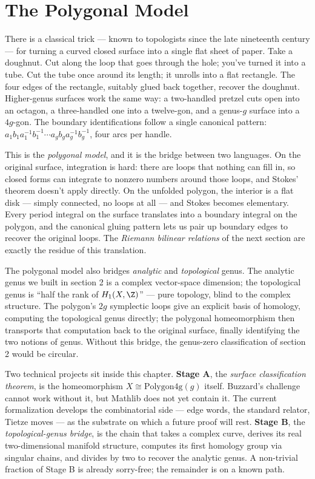 \section{The Polygonal Model}
\label{sec:polygonal-model}

\begin{layman}
There is a classical trick — known to topologists since the late
nineteenth century — for turning a curved closed surface into a
single flat sheet of paper. Take a doughnut. Cut along the loop
that goes through the hole; you've turned it into a tube. Cut the
tube once around its length; it unrolls into a flat rectangle.
The four edges of the rectangle, suitably glued back together,
recover the doughnut. Higher-genus surfaces work the same way: a
two-handled pretzel cuts open into an octagon, a three-handled one
into a twelve-gon, and a genus-\(g\) surface into a \(4g\)-gon.
The boundary identifications follow a single canonical pattern:
\(a_1 b_1 a_1^{-1} b_1^{-1} \cdots a_g b_g a_g^{-1} b_g^{-1}\),
four arcs per handle.

This is the \emph{polygonal model}, and it is the bridge between
two languages. On the original surface, integration is hard: there
are loops that nothing can fill in, so closed forms can integrate
to nonzero numbers around those loops, and Stokes' theorem doesn't
apply directly. On the unfolded polygon, the interior is a flat
disk — simply connected, no loops at all — and Stokes becomes
elementary. Every period integral on the surface translates into a
boundary integral on the polygon, and the canonical gluing pattern
lets us pair up boundary edges to recover the original loops.
The \emph{Riemann bilinear relations} of the next section are
exactly the residue of this translation.

The polygonal model also bridges \emph{analytic} and
\emph{topological} genus. The analytic genus we built in section
2 is a complex vector-space dimension; the topological genus is
``half the rank of \(H_1(X,\Z)\)'' — pure topology, blind to the
complex structure. The polygon's \(2g\) symplectic loops give an
explicit basis of homology, computing the topological genus
directly; the polygonal homeomorphism then transports that
computation back to the original surface, finally identifying the
two notions of genus. Without this bridge, the genus-zero
classification of section 2 would be circular.

Two technical projects sit inside this chapter. \textbf{Stage A},
the \emph{surface classification theorem}, is the homeomorphism
\(X \cong \mathrm{Polygon4g}(g)\) itself. Buzzard's challenge cannot
work without it, but Mathlib does not yet contain it. The current
formalization develops the combinatorial side — edge words, the
standard relator, Tietze moves — as the substrate on which a future
proof will rest. \textbf{Stage B}, the \emph{topological-genus
bridge}, is the chain that takes a complex curve, derives its real
two-dimensional manifold structure, computes its first homology
group via singular chains, and divides by two to recover the
analytic genus. A non-trivial fraction of Stage B is already
sorry-free; the remainder is on a known path.
\end{layman}

